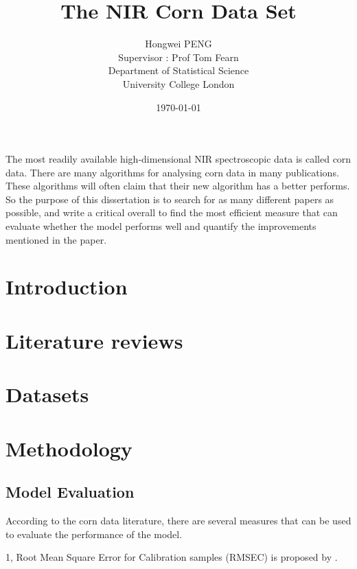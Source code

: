 \documentclass[a4paper,12pt,titlepage]{article} %
\title{The NIR Corn Data Set}
\author{Hongwei PENG \vspace{2cm} \\
	Supervisor : Prof Tom Fearn \vspace{2cm} \\
	Department of Statistical Science \\
	University College London}
\date{\today} %
\numberwithin{equation}{section}  %
\begin{document}
	\maketitle         %
	\tableofcontents   %
	\newpage           %
	
	The most readily available high-dimensional NIR spectroscopic data is called corn data. There are many algorithms for analysing corn data in many publications. These algorithms will often claim that their new algorithm has a better performs. So the purpose of this dissertation is to search for as many different papers as possible, and write a critical overall to find the most efficient measure that can evaluate whether the model performs well and quantify the improvements mentioned in the paper.
	
	\section{Introduction}             %
	\label{sec:intro}                  %
	
	\section{Literature reviews}
	\label{sec:liter}
	
	\section{Datasets}
	\label{sec:data}
	
	\section{Methodology}
	\label{sec:method}
	
	\subsection{Model Evaluation}
	\label{sec:eva}
	According to the corn data literature, there are several measures that can be used to evaluate the performance of the model.
	
	1, Root Mean Square Error for Calibration samples (RMSEC) is proposed by \citet{2yun2014strategy}.
	
\end{document}
